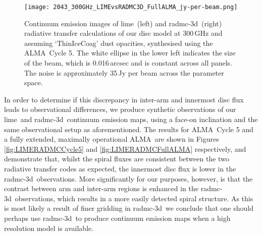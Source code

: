 \documentclass[fleqn,usenatbib]{mnras}
\newcommand{\lime}{{\sc lime}}
\newcommand{\radmc}{{\sc radmc-3d}}
\newcommand{\alma}{ALMA}
\begin{document}
\begin{figure}
    \centering
    \texttt{[image: 2043\_300GHz\_LIMEvsRADMC3D\_FullALMA\_jy-per-beam.png]}
    \caption{Continuum emission images of \lime\ (left) and \radmc\ (right) radiative transfer calculations of our disc model at 300\,GHz and assuming `ThinIceCoag' dust opacities, synthesised using the \alma\ Cycle 5. The white ellipse in the lower left indicates the size of the beam, which is 0.016\,arcsec and is constant across all panels. The noise is approximately 35\,\textmu Jy per beam across the parameter space.}
    \label{fig:LIMERADMCFullALMA}
\end{figure}

In order to determine if this discrepancy in inter-arm and innermost disc flux leads to observational differences, we produce synthetic observations of our \lime\ and \radmc\ continuum emission maps, using a face-on inclination and the same observational setup as aforementioned. The results for \alma\ Cycle 5 and a fully extended, maximally operational \alma\ are shown in Figures \autoref{fig:LIMERADMCCycle5} and \autoref{fig:LIMERADMCFullALMA} respectively, and demonstrate that, whilst the spiral fluxes are consistent between the two radiative transfer codes as expected, the innermost disc flux is lower in the \radmc\ observations. More significantly for our purposes, however, is that the contrast between arm and inter-arm regions is enhanced in the \radmc\ observations, which results in a more easily detected spiral structure. As this is most likely a result of finer gridding in \radmc\, we conclude that one should perhaps use \radmc\ to produce continuum emission maps when a high resolution model is available.

\smallskip
\end{document}

